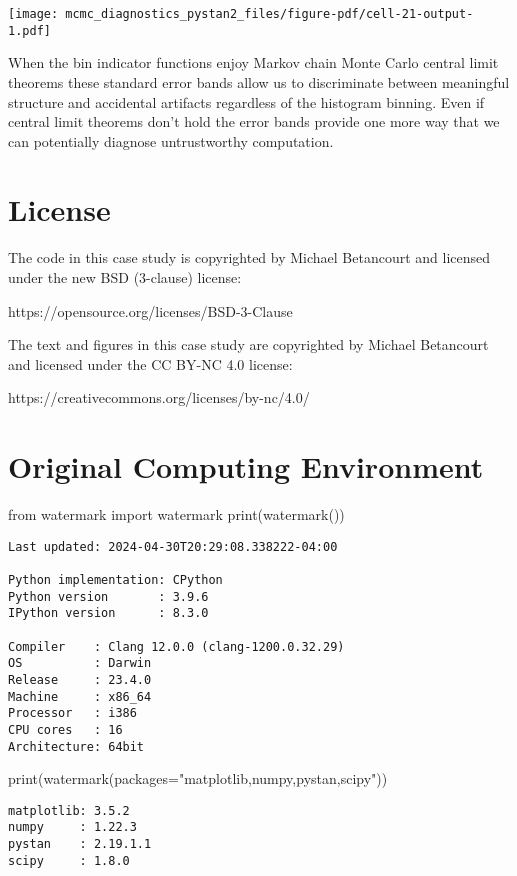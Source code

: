 \documentclass[
  letterpaper,
  DIV=11,
  numbers=noendperiod]{scrartcl}
\newenvironment{Shaded}{\begin{snugshade}}{\end{snugshade}}
\newcommand{\BuiltInTok}[1]{\textcolor[rgb]{0.00,0.23,0.31}{#1}}
\newcommand{\ImportTok}[1]{\textcolor[rgb]{0.00,0.46,0.62}{#1}}
\newcommand{\NormalTok}[1]{\textcolor[rgb]{0.00,0.23,0.31}{#1}}
\newcommand{\OperatorTok}[1]{\textcolor[rgb]{0.37,0.37,0.37}{#1}}
\newcommand{\StringTok}[1]{\textcolor[rgb]{0.13,0.47,0.30}{#1}}
\begin{document}
\texttt{[image: mcmc\_diagnostics\_pystan2\_files/figure-pdf/cell-21-output-1.pdf]}

When the bin indicator functions enjoy Markov chain Monte Carlo central
limit theorems these standard error bands allow us to discriminate
between meaningful structure and accidental artifacts regardless of the
histogram binning. Even if central limit theorems don't hold the error
bands provide one more way that we can potentially diagnose
untrustworthy computation.

\section*{License}\label{license}

The code in this case study is copyrighted by Michael Betancourt and
licensed under the new BSD (3-clause) license:

https://opensource.org/licenses/BSD-3-Clause

The text and figures in this case study are copyrighted by Michael
Betancourt and licensed under the CC BY-NC 4.0 license:

https://creativecommons.org/licenses/by-nc/4.0/

\section*{Original Computing
Environment}\label{original-computing-environment}

\begin{Shaded}
\begin{Highlighting}[]
\ImportTok{from}\NormalTok{ watermark }\ImportTok{import}\NormalTok{ watermark}
\BuiltInTok{print}\NormalTok{(watermark())}
\end{Highlighting}
\end{Shaded}

\begin{verbatim}
Last updated: 2024-04-30T20:29:08.338222-04:00

Python implementation: CPython
Python version       : 3.9.6
IPython version      : 8.3.0

Compiler    : Clang 12.0.0 (clang-1200.0.32.29)
OS          : Darwin
Release     : 23.4.0
Machine     : x86_64
Processor   : i386
CPU cores   : 16
Architecture: 64bit
\end{verbatim}

\begin{Shaded}
\begin{Highlighting}[]
\BuiltInTok{print}\NormalTok{(watermark(packages}\OperatorTok{=}\StringTok{"matplotlib,numpy,pystan,scipy"}\NormalTok{))}
\end{Highlighting}
\end{Shaded}

\begin{verbatim}
matplotlib: 3.5.2
numpy     : 1.22.3
pystan    : 2.19.1.1
scipy     : 1.8.0
\end{verbatim}
\end{document}
